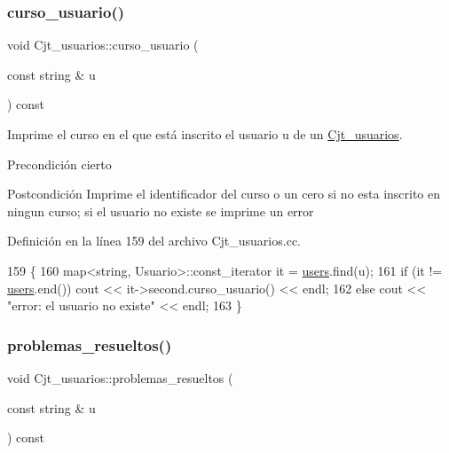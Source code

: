 \subsubsection{\texorpdfstring{curso\+\_\+usuario()}{curso\_usuario()}}
{\footnotesize\ttfamily void Cjt\+\_\+usuarios\+::curso\+\_\+usuario (\begin{DoxyParamCaption}\item[{const string \&}]{u }\end{DoxyParamCaption}) const}



Imprime el curso en el que está inscrito el usuario u de un \mbox{\hyperlink{class_cjt__usuarios}{Cjt\+\_\+usuarios}}. 

\begin{DoxyPrecond}{Precondición}
cierto 
\end{DoxyPrecond}
\begin{DoxyPostcond}{Postcondición}
Imprime el identificador del curso o un cero si no esta inscrito en ningun curso; si el usuario no existe se imprime un error 
\end{DoxyPostcond}


Definición en la línea 159 del archivo Cjt\+\_\+usuarios.\+cc.


\begin{DoxyCode}
159                                                             \{
160         map<string, Usuario>::const\_iterator it = \mbox{\hyperlink{class_cjt__usuarios_a0b702ca0184d6fb2674cc827d39d5bff}{users}}.find(u);
161         \textcolor{keywordflow}{if} (it != \mbox{\hyperlink{class_cjt__usuarios_a0b702ca0184d6fb2674cc827d39d5bff}{users}}.end()) cout << it->second.curso\_usuario() << endl;
162         \textcolor{keywordflow}{else} cout << \textcolor{stringliteral}{"error: el usuario no existe"} << endl;
163       \}
\end{DoxyCode}
\mbox{\label{class_cjt__usuarios_a08ce8035512646dec31f4959dc8aa891}} 
\subsubsection{\texorpdfstring{problemas\+\_\+resueltos()}{problemas\_resueltos()}}
{\footnotesize\ttfamily void Cjt\+\_\+usuarios\+::problemas\+\_\+resueltos (\begin{DoxyParamCaption}\item[{const string \&}]{u }\end{DoxyParamCaption}) const}



